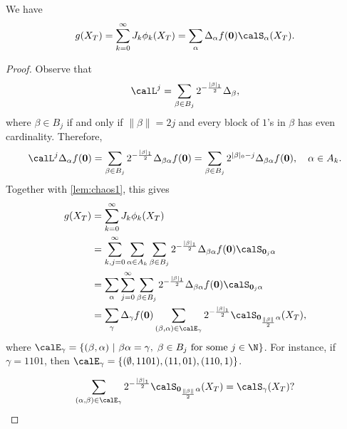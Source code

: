  
 \begin{theorem}
 We have 
  \begin{equation}
     g(X_T) = \sum_{k=0}^{\infty} J_k \phi_k (X_T) = \sum_{\alpha}  \Delta_{ \alpha} f(\boldsymbol{0}) \calS_{\alpha} (X_T).
 \end{equation}
  

  
 \end{theorem}
 
 \begin{proof}  
Observe that 
 $$\calL^j = \sum_{\beta \in B_j} 2^{-\frac{|\beta|_1}{2}} \Delta_{\beta},   $$
 where $\beta \in B_j$ if and only if $\lVert \beta \rVert = 2j$  and  every block of $1$'s in $\beta$ has even cardinality. Therefore,
 $$\calL^{j} \Delta_{\alpha} f(\boldsymbol{0}) = \sum_{\beta \in B_j} 2^{-\frac{|\beta|_1}{2}} \Delta_{\beta \alpha}f(\boldsymbol{0}) = \sum_{\beta \in B_j} 2^{|\beta|_0-j} \Delta_{\beta \alpha}f(\boldsymbol{0}) , \quad \alpha \in A_k.  $$
 Together with \cref{lem:chaos1}, this gives
  \begin{align*}
      g(X_T) &= \sum_{k=0}^{\infty}  J_k \phi_k (X_T) \\ 
      &= \sum_{k,j=0}^{\infty}  \sum_{\alpha \in A_k} \sum_{\beta \in B_j} 
       2^{-\frac{|\beta|_1}{2}} \Delta_{\beta \alpha}f(\boldsymbol{0}) \calS_{\boldsymbol{0}_j\alpha} \\ 
      &= \sum_{\alpha} \sum_{j=0}^{\infty} 
      \sum_{\beta \in B_j}
      2^{-\frac{|\beta|_1}{2}}
      \Delta_{\beta \alpha}f(\boldsymbol{0}) \calS_{\boldsymbol{0}_j\alpha}\\ 
      &=\sum_{\gamma} \Delta_{\gamma}f(\boldsymbol{0}) \sum_{(\beta,\alpha) \in \calE_{\gamma}}   
      2^{-\frac{|\beta|_1}{2}} \calS_{\boldsymbol{0}_{\frac{\lVert \beta \rVert}{2}}\alpha}(X_T), 
  \end{align*}
  where $\calE_{\gamma} = \{(\beta,\alpha) \ | \ \beta \alpha = \gamma, \; \beta \in B_j \text{ for some } j\in \N\}$.  For instance, if  $\gamma = 1101$, then $\calE_{\gamma} = \{(\emptyset,1101),(11,01),(110,1)\}$.   
  
  $$\sum_{(\alpha,\beta) \in \calE_{\gamma}} 
      2^{-\frac{|\beta|_1}{2}} \calS_{\boldsymbol{0}_{\frac{\lVert \beta \rVert}{2}}\alpha}(X_T) = \calS_{\gamma}(X_T)? $$
     
 \end{proof}

